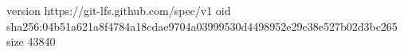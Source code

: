 version https://git-lfs.github.com/spec/v1
oid sha256:04b51a621a8f4784a18cdae9704a03999530d4498952e29c38e527b02d3bc265
size 43840

